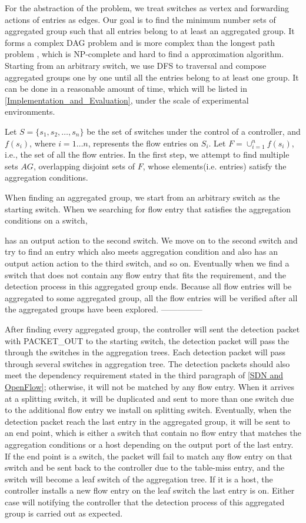 For the abstraction of the problem, we treat switches as vertex and forwarding actions of entries as edges. Our goal is to find the minimum number sets of aggregated group such that all entries belong to at least an aggregated group. It forms a complex DAG problem and is more complex than the longest path problem \cite{DMR97,RU04}, which is NP-complete and hard to find a approximation algorithm. Starting from an arbitrary switch, we use DFS to traversal and compose aggregated groups one by one until all the entries belong to at least one group. It can be done in a reasonable amount of time, which will be listed in \ref{Implementation_and_Evaluation}, under the scale of experimental environments.

Let $S=\{s_1,s_2,\ldots,s_n\}$ be the set of switches under the control of a controller, and $f(s_i)$, where $i=1\ldots n$, represents the flow entries on $S_i$. Let $F=\cup_{i=1}^n f(s_i)$, i.e., the set of all the flow entries. In the first step, we attempt to find multiple sets $AG$, overlapping disjoint sets of $F$, whose elements(i.e. entries) satisfy the aggregation conditions. 

When finding an aggregated group, we start from an arbitrary switch as the starting switch. When we searching for flow entry that satisfies the aggregation conditions on a switch, 


has an output action to the second switch. We move on to the second switch and try to find an entry which also meets aggregation condition and also has an output action action to the third switch, and so on. Eventually when we find a switch that does not contain any flow entry that fits the requirement, and the detection process in this aggregated group ends. Because all flow entries will be aggregated to some aggregated group, all the flow entries will be verified after all the aggregated groups have been explored.
---------------




After finding every aggregated group, the controller will sent the detection packet with PACKET\_OUT to the starting switch, the detection packet will pass the through the switches in the aggregation trees. Each detection packet will pass through several switches in aggregation tree. The detection packets should also meet the dependency requirement stated in the third paragraph of \ref{SDN and OpenFlow}; otherwise, it will not be matched by any flow entry. When it arrives at a splitting switch, it will be duplicated and sent to more than one switch due to the additional flow entry we install on splitting switch. Eventually, when the detection packet reach the last entry in the aggregated group, it will be sent to an end point, which is either a switch that contain no flow entry that matches the aggregation conditions or a host depending on the output port of the last entry. If the end point is a switch, the packet will fail to match any flow entry on that switch and be sent back to the controller due to the table-miss entry, and the switch will become a leaf switch of the aggregation tree. If it is a host, the controller installs a new flow entry on the leaf switch the last entry is on. Either case will notifying the controller that the detection process of this aggregated group is carried out as expected.

